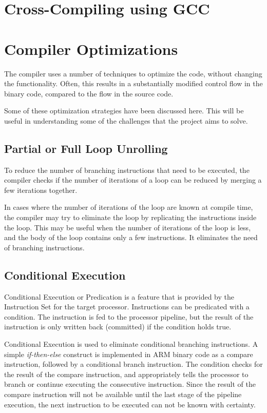 
\section{Cross-Compiling using GCC}

\section{Compiler Optimizations}
\label{sec:CompilerOptimizations}
The compiler uses a number of techniques to optimize the code, without changing the functionality. Often, this results in a substantially modified control flow in the binary code, compared to the flow in the source code.

Some of these optimization strategies have been discussed here. This will be useful in understanding some of the challenges that the project aims to solve.

\subsection{Partial or Full Loop Unrolling}
To reduce the number of branching instructions that need to be executed, the compiler checks if the number of iterations of a loop can be reduced by merging a few iterations together. 

In cases where the number of iterations of the loop are known at compile time, the compiler may try to eliminate the loop by replicating the instructions inside the loop. This may be useful when the number of iterations of the loop is less, and the body of the loop contains only a few instructions. It eliminates the need of branching instructions.

\subsection{Conditional Execution}
Conditional Execution or Predication is a feature that is provided by the Instruction Set for the target processor. Instructions can be predicated with a condition. The instruction is fed to the processor pipeline, but the result of the instruction is only written back (committed) if the condition holds true.

Conditional Execution is used to eliminate conditional branching instructions. A simple \textit{if-then-else} construct is implemented in ARM binary code as a compare instruction, followed by a conditional branch instruction. The condition checks for the result of the compare instruction, and appropriately tells the processor to branch or continue executing the consecutive instruction. Since the result of the compare instruction will not be available until the last stage of the pipeline execution, the next instruction to be executed can not be known with certainty. 

